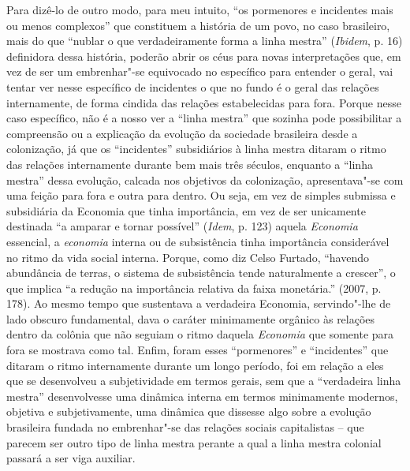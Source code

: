 Para dizê-lo de outro modo, para meu intuito, ``os pormenores e
incidentes mais ou menos complexos'' que constituem a história de um
povo, no caso brasileiro, mais do que ``nublar o que verdadeiramente
forma a linha mestra'' (\emph{Ibidem}, p. 16) definidora dessa história,
poderão abrir os céus para novas interpretações que, em vez de ser um
embrenhar"-se equivocado no específico para entender o geral, vai tentar
ver nesse específico de incidentes o que no fundo é o geral das relações
internamente, de forma cindida das relações estabelecidas para fora.
Porque nesse caso específico, não é a nosso ver a ``linha mestra'' que
sozinha pode possibilitar a compreensão ou a explicação da evolução da
sociedade brasileira desde a colonização, já que os ``incidentes''
subsidiários à linha mestra ditaram o ritmo das relações internamente
durante bem mais três séculos, enquanto a ``linha mestra'' dessa
evolução, calcada nos objetivos da colonização, apresentava"-se com uma
feição para fora e outra para dentro. Ou seja, em vez de simples
submissa e subsidiária da Economia que tinha importância, em vez de ser
unicamente destinada ``a amparar e tornar possível'' (\emph{Idem}, p.
123) aquela \emph{Economia} essencial, a \emph{economia} interna ou de
subsistência tinha importância considerável no ritmo da vida social
interna. Porque, como diz Celso Furtado, ``havendo abundância de terras,
o sistema de subsistência tende naturalmente a crescer'', o que implica
``a redução na importância relativa da faixa monetária.'' (2007, p.
178). Ao mesmo tempo que sustentava a verdadeira Economia, servindo"-lhe
de lado obscuro fundamental, dava o caráter minimamente orgânico às
relações dentro da colônia que não seguiam o ritmo daquela
\emph{Economia} que somente para fora se mostrava como tal. Enfim, foram
esses ``pormenores'' e ``incidentes'' que ditaram o ritmo internamente
durante um longo período, foi em relação a eles que se desenvolveu a
subjetividade em termos gerais, sem que a ``verdadeira linha mestra''
desenvolvesse uma dinâmica interna em termos minimamente modernos,
objetiva e subjetivamente, uma dinâmica que dissesse algo sobre a
evolução brasileira fundada no embrenhar"-se das relações sociais
capitalistas -- que parecem ser outro tipo de linha mestra perante a
qual a linha mestra colonial passará a ser viga auxiliar.

